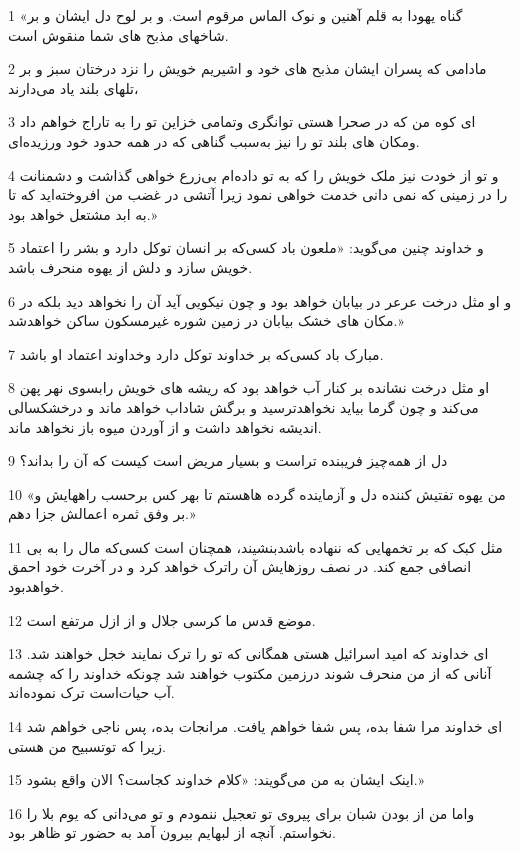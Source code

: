 \par 1 «گناه یهودا به قلم آهنین و نوک الماس مرقوم است. و بر لوح دل ایشان و بر شاخهای مذبح های شما منقوش است.
\par 2 مادامی که پسران ایشان مذبح های خود و اشیریم خویش را نزد درختان سبز و بر تلهای بلند یاد می‌دارند،
\par 3 ‌ای کوه من که در صحرا هستی توانگری وتمامی خزاین تو را به تاراج خواهم داد ومکان های بلند تو را نیز به‌سبب گناهی که در همه حدود خود ورزیده‌ای.
\par 4 و تو از خودت نیز ملک خویش را که به تو داده‌ام بی‌زرع خواهی گذاشت و دشمنانت را در زمینی که نمی دانی خدمت خواهی نمود زیرا آتشی در غضب من افروخته‌اید که تا به ابد مشتعل خواهد بود.»
\par 5 و خداوند چنین می‌گوید: «ملعون باد کسی‌که بر انسان توکل دارد و بشر را اعتماد خویش سازد و دلش از یهوه منحرف باشد.
\par 6 و او مثل درخت عرعر در بیابان خواهد بود و چون نیکویی آید آن را نخواهد دید بلکه در مکان های خشک بیابان در زمین شوره غیرمسکون ساکن خواهدشد.»
\par 7 مبارک باد کسی‌که بر خداوند توکل دارد وخداوند اعتماد او باشد.
\par 8 او مثل درخت نشانده بر کنار آب خواهد بود که ریشه های خویش رابسوی نهر پهن می‌کند و چون گرما بیاید نخواهدترسید و برگش شاداب خواهد ماند و درخشکسالی اندیشه نخواهد داشت و از آوردن میوه باز نخواهد ماند.
\par 9 دل از همه‌چیز فریبنده تراست و بسیار مریض است کیست که آن را بداند؟
\par 10 «من یهوه تفتیش کننده دل و آزماینده گرده هاهستم تا بهر کس بر‌حسب راههایش و بر وفق ثمره اعمالش جزا دهم.»
\par 11 مثل کبک که بر تخمهایی که ننهاده باشدبنشیند، همچنان است کسی‌که مال را به بی انصافی جمع کند. در نصف روزهایش آن راترک خواهد کرد و در آخرت خود احمق خواهدبود.
\par 12 موضع قدس ما کرسی جلال و از ازل مرتفع است.
\par 13 ‌ای خداوند که امید اسرائیل هستی همگانی که تو را ترک نمایند خجل خواهند شد. آنانی که از من منحرف شوند درزمین مکتوب خواهند شد چونکه خداوند را که چشمه آب حیات‌است ترک نموده‌اند.
\par 14 ‌ای خداوند مرا شفا بده، پس شفا خواهم یافت. مرانجات بده، پس ناجی خواهم شد زیرا که توتسبیح من هستی.
\par 15 اینک ایشان به من می‌گویند: «کلام خداوند کجاست؟ الان واقع بشود.»
\par 16 واما من از بودن شبان برای پیروی تو تعجیل ننمودم و تو می‌دانی که یوم بلا را نخواستم. آنچه از لبهایم بیرون آمد به حضور تو ظاهر بود.
